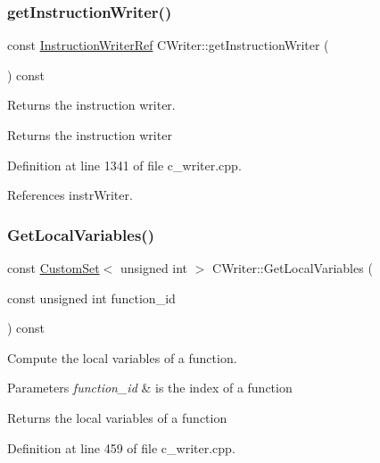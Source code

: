 \subsubsection{\texorpdfstring{get\+Instruction\+Writer()}{getInstructionWriter()}}
{\footnotesize\ttfamily const \hyperlink{instruction__writer_8hpp_a40ea26c38a2909ba48f88f997144b260}{Instruction\+Writer\+Ref} C\+Writer\+::get\+Instruction\+Writer (\begin{DoxyParamCaption}{ }\end{DoxyParamCaption}) const}



Returns the instruction writer. 

\begin{DoxyReturn}{Returns}
the instruction writer 
\end{DoxyReturn}


Definition at line 1341 of file c\+\_\+writer.\+cpp.



References instr\+Writer.

\mbox{\label{classCWriter_aad06f4f569e3a651b401c963b1dcada8}} 
\subsubsection{\texorpdfstring{Get\+Local\+Variables()}{GetLocalVariables()}}
{\footnotesize\ttfamily const \hyperlink{custom__set_8hpp_a615bc2f42fc38a4bb1790d12c759e86f}{Custom\+Set}$<$ unsigned int $>$ C\+Writer\+::\+Get\+Local\+Variables (\begin{DoxyParamCaption}\item[{const unsigned int}]{function\+\_\+id }\end{DoxyParamCaption}) const}



Compute the local variables of a function. 


\begin{DoxyParams}{Parameters}
{\em function\+\_\+id} & is the index of a function \\
\hline
\end{DoxyParams}
\begin{DoxyReturn}{Returns}
the local variables of a function 
\end{DoxyReturn}


Definition at line 459 of file c\+\_\+writer.\+cpp.



